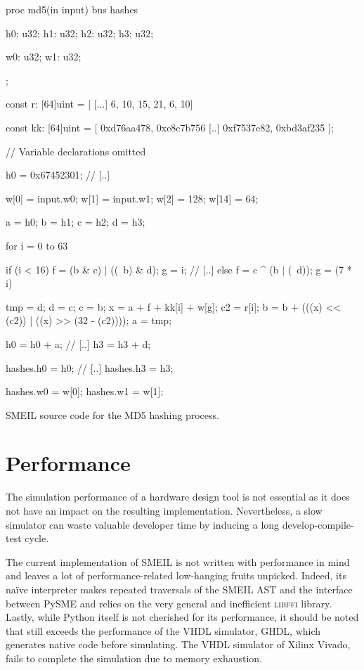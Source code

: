 \begin{widefigure}

\begin{smeilcode2}
proc md5(in input)
  bus hashes {
    h0: u32;
    h1: u32;
    h2: u32;
    h3: u32;

    w0: u32;
    w1: u32;
  };

  const r: [64]uint = [
    [...]
    6, 10, 15, 21, 6, 10]

  const kk: [64]uint = [
    0xd76aa478, 0xe8c7b756
    [..]
    0xf7537e82, 0xbd3af235
    ];

// Variable declarations omitted

{
  h0 = 0x67452301;
  // [..]

  w[0] = input.w0;
  w[1] = input.w1;
  w[2] = 128;
  w[14] = 64;

  a = h0;
  b = h1;
  c = h2;
  d = h3;

for i = 0 to 63 {
  if (i < 16) {
    f = (b & c) | ((~b) & d);
    g = i;
   // [..]
  } else {
    f = c ^ (b | (~d));
    g = (7 * i) %
  }

  tmp = d;
  d = c;
  c = b;
  x = a + f + kk[i] + w[g];
  c2 = r[i];
  b = b + (((x) << (c2)) |
      ((x) >> (32 - (c2))));
  a = tmp;
}

h0 = h0 + a;
// [..]
h3 = h3 + d;

hashes.h0 = h0;
// [..]
hashes.h3 = h3;

hashes.w0 = w[0];
hashes.w1 = w[1];
}

\end{smeilcode2}
  \caption{SMEIL source code for the MD5 hashing process.}
  \label{fig:smeilhash}

\end{widefigure}

\section{Performance}
The simulation performance of a hardware design tool is not essential as it does
not have an impact on the resulting implementation. Nevertheless, a slow
simulator can waste valuable developer time by inducing a long
develop-compile-test cycle.

The current implementation of SMEIL is not written with performance in mind and
leaves a lot of performance-related low-hanging fruits unpicked. Indeed, its
naïve interpreter makes repeated traversals of the SMEIL AST and the interface
between PySME and \libsme{} relies on the very general and inefficient
\textsc{libffi} library.
Lastly, while Python itself is not cherished for its performance, it should be
noted that \libsme{} still exceeds the performance of the VHDL simulator, GHDL, 
which generates native code before simulating. The VHDL
simulator of Xilinx Vivado, fails to complete the simulation due to memory
exhaustion.

